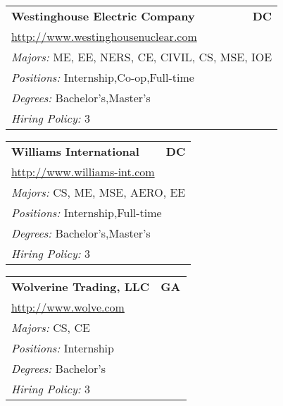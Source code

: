 \documentclass[twoside]{article}
\begin{document}
\begin{center}
\begin{multicols}{3}
\begin{FlushLeft}
\begin{minipage}{.9\columnwidth}
\end{minipage}
 
\begin{minipage}{.9\columnwidth}\begin{tabularx}{.95\columnwidth}{Xr}
                 {\Large\bf Westinghouse Electric Company} & {\Large\bf DC}\\
    \multicolumn{2}{p{.95\columnwidth}}{\url{http://www.westinghousenuclear.com}}\\
    \multicolumn{2}{p{.95\columnwidth}}{\emph{Majors:} ME, EE, NERS, CE, CIVIL, CS, MSE, IOE}\\
    \multicolumn{2}{p{.95\columnwidth}}{\emph{Positions:} Internship,Co-op,Full-time}\\
    \multicolumn{2}{p{.95\columnwidth}}{\emph{Degrees:} Bachelor's,Master's}\\
    \multicolumn{2}{p{.95\columnwidth}}{\emph{Hiring Policy:} 3}\\
    \end{tabularx}
    
\end{minipage}
 
\begin{minipage}{.9\columnwidth}\begin{tabularx}{.95\columnwidth}{Xr}
                 {\Large\bf Williams International} & {\Large\bf DC}\\
    \multicolumn{2}{p{.95\columnwidth}}{\url{http://www.williams-int.com}}\\
    \multicolumn{2}{p{.95\columnwidth}}{\emph{Majors:} CS, ME, MSE, AERO, EE}\\
    \multicolumn{2}{p{.95\columnwidth}}{\emph{Positions:} Internship,Full-time}\\
    \multicolumn{2}{p{.95\columnwidth}}{\emph{Degrees:} Bachelor's,Master's}\\
    \multicolumn{2}{p{.95\columnwidth}}{\emph{Hiring Policy:} 3}\\
    \end{tabularx}
    
\end{minipage}
 
\begin{minipage}{.9\columnwidth}\begin{tabularx}{.95\columnwidth}{Xr}
                 {\Large\bf Wolverine Trading, LLC} & {\Large\bf GA}\\
    \multicolumn{2}{p{.95\columnwidth}}{\url{http://www.wolve.com}}\\
    \multicolumn{2}{p{.95\columnwidth}}{\emph{Majors:} CS, CE}\\
    \multicolumn{2}{p{.95\columnwidth}}{\emph{Positions:} Internship}\\
    \multicolumn{2}{p{.95\columnwidth}}{\emph{Degrees:} Bachelor's}\\
    \multicolumn{2}{p{.95\columnwidth}}{\emph{Hiring Policy:} 3}\\
    \end{tabularx}
    

\end{minipage}
\end{FlushLeft}
\end{multicols}
\end{center}
\end{document}
